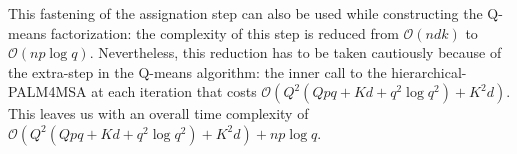 This fastening of the assignation step can also be used while constructing the Q-means factorization: the complexity of this step is reduced from $\mathcal{O}(ndk)$ to $\mathcal{O}(np \log q)$. Nevertheless, this reduction has to be taken cautiously because of the extra-step in the Q-means algorithm: the inner call to the hierarchical-PALM4MSA at each iteration that costs $\mathcal{O}(Q^2(Qpq + Kd + q^2\log q^2) + K^2d)$. This leaves us with an overall time complexity of $\mathcal{O}(Q^2(Qpq + Kd + q^2\log q^2) + K^2d) + np \log q$. 




